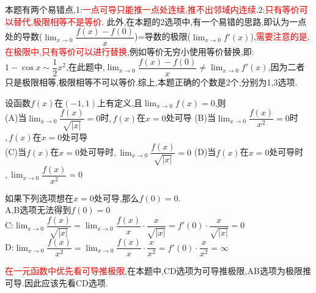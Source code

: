 \documentclass[8pt a4paper, oneside, UTF8]{ctexbook}  %
\begin{document}
\begin{sloppypar}
    \begin{note}
        本题有两个易错点,1:\textcolor{red}{一点可导只能推一点处连续,推不出邻域内连续.}2:\textcolor{red}{只有等价可以替代,极限相等不是等价}.\newline
        此外,在本题的2选项中,有一个易错的思路,即认为一点处的导数($\lim_{x\to 0}\dfrac{f(x)-f(0)}{x}$)=导数的极限($\lim_{x\to 0}f'(x)$),\textcolor{red}{需要注意的是,在极限中,只有等价可以进行替换},例如等价无穷小使用等价替换,即:$1-\cos x \sim \dfrac{1}{2}x^2$,在此题中,$\lim_{x\to 0}\dfrac{f(x)-f(0)}{x} \neq \lim_{x\to 0}f'(x)$,因为二者只是极限相等,极限相等不可以等价.综上,本题正确的个数是2个,分别为1,3选项.
    \end{note}
    \begin{problem}
    设函数$f(x)$在$(-1,1)$上有定义,且$\lim_{x\to0}f(x)=0$,则\\
    (A)当$\lim_{x\to 0}\dfrac{f(x)}{\sqrt{|x|}}=0$时$,f(x)$在$x=0$处可导
    (B)当$\lim_{x\to 0}\dfrac{f(x)}{x^{2}}=0$时$,f(x)$在$x=0$处可导\\
    (C)当$f(x)$在$x=0$处可导时$,\lim_{x\to0}\dfrac{f(x)}{\sqrt{|x|}}=0$\quad
    (D)当$f(x)$在$x=0$处可导时$,\lim_{x\to0}\dfrac{f(x)}{x^{2}}=0$
    \end{problem}
    \begin{solution}
        如果下列选项想在$x=0$处可导,那么$f(0)=0$.\\
        A,B选项无法得到$f(0)=0$\\
        C:$\lim_{x\to 0}\dfrac{f(x)}{\sqrt{|x|}}=\lim_{x\to 0} \dfrac{f(x)}{x}\cdot \dfrac{x}{\sqrt{|x|}}=f'(0)\cdot \dfrac{x}{\sqrt{|x|}}=0$\\
        D:$\lim_{x\to 0}\dfrac{f(x)}{x^2}=\lim_{x\to 0} \dfrac{f(x)}{x}\cdot \dfrac{x}{x^2}=f'(0)\cdot \dfrac{x}{x^2}=\infty$
    \end{solution}
    \begin{note}
        \textcolor{red}{在一元函数中优先看可导推极限},在本题中,CD选项为可导推极限,AB选项为极限推可导.因此应该先看CD选项.
    \end{note}

\end{sloppypar}
\end{document}

